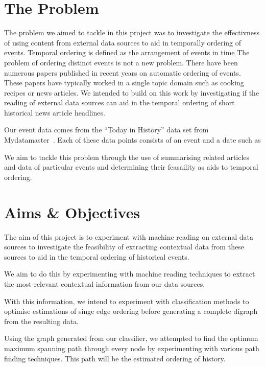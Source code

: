 \documentclass[bsc,frontabs,twoside,singlespacing,parskip,deptreport]{infthesis}     %
\begin{document}
\section{The Problem}
The problem we aimed to tackle in this project was to investigate the effectivness of using content from
external data sources to aid in temporally ordering of events.
Temporal ordering is defined as the arrangement of events in time
The problem of ordering distinct events is not a new problem. There have been numerous papers published
in recent years on automatic ordering of events. These papers have typically worked in a single
topic domain such as cooking recipes or news articles. We intended to build on this work by
investigating if the reading of external data sources can aid in the temporal ordering of short
historical news article headlines.

Our event data comes from the ``Today in History'' data set from Mydatamaster~\cite{mydatamaster}. Each of these data points consists
of an event and a date such as
\begin{equation}
  [ \text{``Alaska becomes 49th State''}, \text{``1959-01-01''} ]\nonumber
\end{equation}


We aim to tackle this problem through the use of summarising related articles and data of particular
events and determining their feasaility as aids to temporal ordering. 

\section{Aims \& Objectives}
The aim of this project is to experiment with machine reading on external data sources to
investigate the feasibility of extracting contextual data from these sources to aid in the
temporal ordering of historical events.

We aim to do this by experimenting with machine reading techniques to extract the most
relevant contextual information from our data sources.

With this information, we intend to experiment with classification methods to optimise estimations
of singe edge ordering before generating a complete digraph from the resulting data.

Using the graph generated from our classifier, we attempted to find the optimum maximum spanning path
through every node by experimenting with various path finding techniques.
This path will be the estimated ordering of history.
\end{document}
